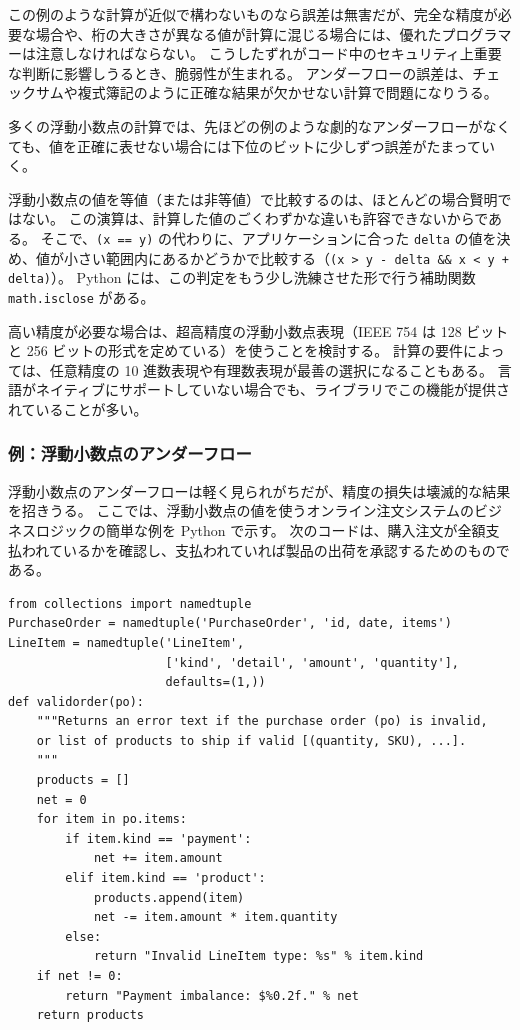 \documentclass[uplatex]{jsarticle}
\def\label#1{}%
\begin{document}
この例のような計算が近似で構わないものなら誤差は無害だが、完全な精度が必要な場合や、桁の大きさが異なる値が計算に混じる場合には、優れたプログラマーは注意しなければならない。
こうしたずれがコード中のセキュリティ上重要な判断に影響しうるとき、脆弱性が生まれる。
アンダーフローの誤差は、チェックサムや複式簿記のように正確な結果が欠かせない計算で問題になりうる。

多くの浮動小数点の計算では、先ほどの例のような劇的なアンダーフローがなくても、値を正確に表せない場合には下位のビットに少しずつ誤差がたまっていく。

\begin{rem}[浮動小数点数の等値比較を避ける]\label{rem:ch9-float-equality}
浮動小数点の値を等値（または非等値）で比較するのは、ほとんどの場合賢明ではない。
この演算は、計算した値のごくわずかな違いも許容できないからである。
そこで、\texttt{(x == y)} の代わりに、アプリケーションに合った \texttt{delta} の値を決め、値が小さい範囲内にあるかどうかで比較する（\texttt{(x > y - delta \&\& x < y + delta)}）。
Python には、この判定をもう少し洗練させた形で行う補助関数 \texttt{math.isclose} がある。
\end{rem}

高い精度が必要な場合は、超高精度の浮動小数点表現（IEEE 754 は 128 ビットと 256 ビットの形式を定めている）を使うことを検討する。
計算の要件によっては、任意精度の 10 進数表現や有理数表現が最善の選択になることもある。
言語がネイティブにサポートしていない場合でも、ライブラリでこの機能が提供されていることが多い。

\subsubsection{例：浮動小数点のアンダーフロー}\label{subsec:ch9-example-float-underflow}

浮動小数点のアンダーフローは軽く見られがちだが、精度の損失は壊滅的な結果を招きうる。
ここでは、浮動小数点の値を使うオンライン注文システムのビジネスロジックの簡単な例を Python で示す。
次のコードは、購入注文が全額支払われているかを確認し、支払われていれば製品の出荷を承認するためのものである。

\begin{verbatim}
from collections import namedtuple
PurchaseOrder = namedtuple('PurchaseOrder', 'id, date, items')
LineItem = namedtuple('LineItem',
                      ['kind', 'detail', 'amount', 'quantity'],
                      defaults=(1,))
def validorder(po):
    """Returns an error text if the purchase order (po) is invalid,
    or list of products to ship if valid [(quantity, SKU), ...].
    """
    products = []
    net = 0
    for item in po.items:
        if item.kind == 'payment':
            net += item.amount
        elif item.kind == 'product':
            products.append(item)
            net -= item.amount * item.quantity
        else:
            return "Invalid LineItem type: %s" % item.kind
    if net != 0:
        return "Payment imbalance: $%0.2f." % net
    return products
\end{verbatim}
\end{document}
